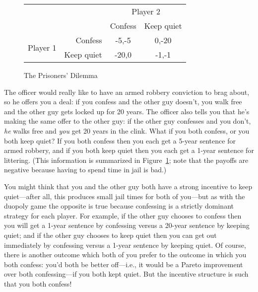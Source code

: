 \begin{figure}[b]
\begin{center}
\begin{tabular}{crcc}
& & \multicolumn{2}{c}{Player 2} \\ [.15cm]
& & Confess & Keep quiet \\ \cline{3-4}
\multirow{2}{1.5cm}{Player 1} & Confess & \multicolumn{1}{|c|}{-5,-5} & \multicolumn{1}{c|}{0,-20} \\ \cline{3-4}
                   & Keep quiet & \multicolumn{1}{|c|}{-20,0} & \multicolumn{1}{c|}{-1,-1} \\ \cline{3-4}
\end{tabular}
\end{center}
\caption{The Prisoners' Dilemma}
\label{game:prisoner1} %
\end{figure}



The officer would really like to have an armed robbery conviction to brag about, so he offers you a deal: if you confess and the other guy doesn't, you walk free and the other guy gets locked up for 20 years. The officer also tells you that he's making the same offer to the other guy: if the other guy confesses and you don't, \emph{he} walks free and \emph{you} get 20 years in the clink. What if you both confess, or you both keep quiet? If you both confess then you each get a 5-year sentence for armed robbery, and if you both keep quiet then you each get a 1-year sentence for littering. (This information is summarized in Figure~\ref{game:prisoner1}; note that the payoffs are negative because having to spend time in jail is bad.)

You might think that you and the other guy both have a strong incentive to keep quiet---after all, this produces small jail times for both of you---but as with the duopoly game the opposite is true because confessing is a strictly dominant strategy for each player. For example, if the other guy chooses to confess then you will get a 1-year sentence by confessing versus a 20-year sentence by keeping quiet; and if the other guy chooses to keep quiet then you can get out immediately by confessing versus a 1-year sentence by keeping quiet. Of course, there is another outcome which both of you prefer to the outcome in which you both confess: you'd both be better off---i.e., it would be a Pareto improvement over both confessing---if you both kept quiet. But the incentive structure is such that you both confess!

